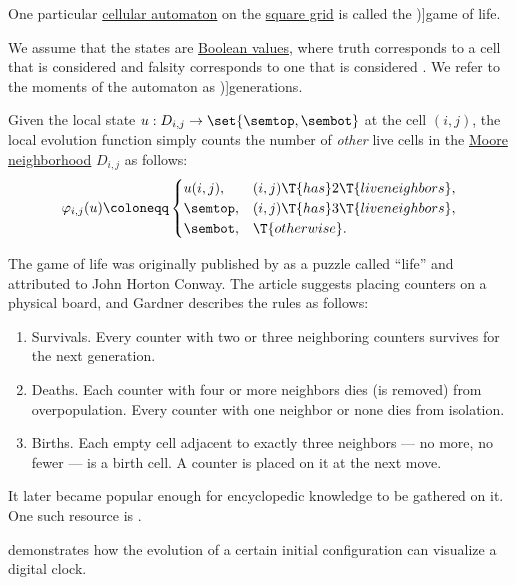 \begin{definition}\label{def:game_of_life}\mimprovised
  One particular \hyperref[def:cellular_automaton]{cellular automaton} on the \hyperref[rem:automata_on_square_grid]{square grid} is called the \term[en=Game of Life (\cite[3]{HadelerMüller2017CellularAutomata})]{game of life}.

  We assume that the states are \hyperref[def:truth_value_algebra]{Boolean values}, where truth corresponds to a cell that is considered  and falsity corresponds to one that is considered . We refer to the moments of the automaton as \term[en=generation (\cite[120]{Gardner1970GameOfLife})]{generations}.

  Given the local state \( u: D_{i, j} \to \set{ \semtop, \sembot } \) at the cell \( (i, j) \), the local evolution function simply counts the number of \emph{other} live cells in the \hyperref[def:cayley_graph_neighborhood/moore]{Moore neighborhood} \( D_{i, j} \) as follows:
  \begin{equation}\label{eq:def:game_of_life}
    \varphi_{i,j}(u) \coloneqq \begin{cases}
      u(i, j), &(i, j) \T{has} 2 \T{live neighbors}, \\
      \semtop, &(i, j) \T{has} 3 \T{live neighbors}, \\
      \sembot, &\T{otherwise}.
    \end{cases}
  \end{equation}
\end{definition}
\begin{comments}
  \item The game of life was originally published by \textcite[120]{Gardner1970GameOfLife} as a puzzle called \enquote{life} and attributed to John Horton Conway. The article suggests placing counters on a physical board, and Gardner describes the rules as follows:
  \begin{displayquote}
    \begin{enumerate}
      \item Survivals. Every counter with two or three neighboring counters survives for the next generation.
      \item Deaths. Each counter with four or more neighbors dies (is removed) from overpopulation. Every counter with one neighbor or none dies from isolation.
      \item Births. Each empty cell adjacent to exactly three neighbors --- no more, no fewer --- is a birth cell. A counter is placed on it at the next move.
    \end{enumerate}
  \end{displayquote}

  It later became popular enough for encyclopedic knowledge to be gathered on it. One such resource is \cite{ConwayLife:home}.

  \cite{CGSE:game_of_life_digital_clock} demonstrates how the evolution of a certain initial configuration can visualize a digital clock.
\end{comments}

